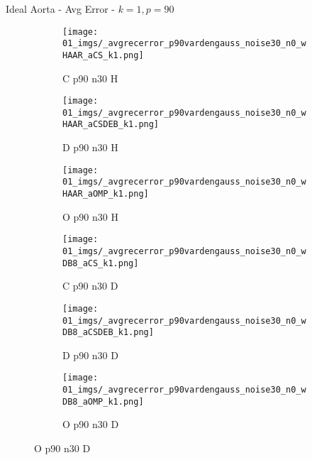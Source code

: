 \begin{frame}{Ideal Aorta - Avg Error - $k=1,p=90$}{}
\begin{figure}
\begin{subfigure}{0.13\textwidth}
\texttt{[image: 01\_imgs/\_avgrecerror\_p90vardengauss\_noise30\_n0\_wHAAR\_aCS\_k1.png]}
\caption*{\tiny C p90 n30 H}
\end{subfigure}
\begin{subfigure}{0.13\textwidth}
\texttt{[image: 01\_imgs/\_avgrecerror\_p90vardengauss\_noise30\_n0\_wHAAR\_aCSDEB\_k1.png]}
\caption*{\tiny D p90 n30 H}
\end{subfigure}
\begin{subfigure}{0.13\textwidth}
\texttt{[image: 01\_imgs/\_avgrecerror\_p90vardengauss\_noise30\_n0\_wHAAR\_aOMP\_k1.png]}
\caption*{\tiny O p90 n30 H}
\end{subfigure}
\begin{subfigure}{0.13\textwidth}
\texttt{[image: 01\_imgs/\_avgrecerror\_p90vardengauss\_noise30\_n0\_wDB8\_aCS\_k1.png]}
\caption*{\tiny C p90 n30 D}
\end{subfigure}
\begin{subfigure}{0.13\textwidth}
\texttt{[image: 01\_imgs/\_avgrecerror\_p90vardengauss\_noise30\_n0\_wDB8\_aCSDEB\_k1.png]}
\caption*{\tiny D p90 n30 D}
\end{subfigure}
\begin{subfigure}{0.13\textwidth}
\texttt{[image: 01\_imgs/\_avgrecerror\_p90vardengauss\_noise30\_n0\_wDB8\_aOMP\_k1.png]}
\caption*{\tiny O p90 n30 D}
\end{subfigure}
\end{figure}
\end{frame}


